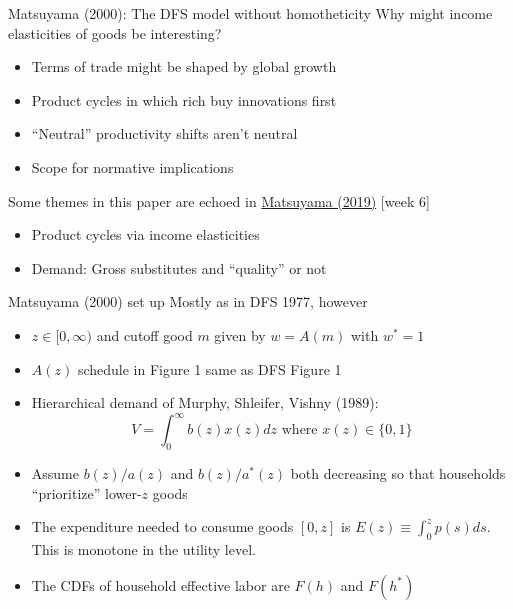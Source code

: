 \documentclass[10pt,notes=hide]{beamer}
\begin{document}
\begin{frame}{Matsuyama (2000): The DFS model without homotheticity}
Why might income elasticities of goods be interesting?
\begin{itemize}
	\item Terms of trade might be shaped by global growth
	\item Product cycles in which rich buy innovations first
	\item ``Neutral'' productivity shifts aren't neutral
	\item Scope for normative implications
\end{itemize}
Some themes in this paper are echoed in \href{https://onlinelibrary-wiley-com.proxy.uchicago.edu/doi/10.3982/ECTA13765}{Matsuyama (2019)} [week 6]
\begin{itemize}
	\item Product cycles via income elasticities
	\item Demand: Gross substitutes and ``quality'' or not
\end{itemize}
\end{frame}
\begin{frame}{Matsuyama (2000) set up}
Mostly as in DFS 1977, however
\begin{itemize}
	\item $z \in [0,\infty)$ and cutoff good $m$ given by $w=A(m)$ with $w^{*}=1$ 
	\item $A(z)$ schedule in Figure 1 same as DFS Figure 1
	\item Hierarchical demand of Murphy, Shleifer, Vishny (1989):
	\begin{equation*} V = \int_{0}^{\infty} b(z)x(z)dz \text { where } x(z) \in \{0,1\} \end{equation*}
	\item Assume $b(z)/a(z)$ and $b(z)/a^{*}(z)$ both decreasing so that households ``prioritize'' lower-$z$ goods
	\item The expenditure needed to consume goods $[0,z]$ is $E(z)\equiv \int_{0}^{z} p(s)ds$. This is monotone in the utility level.
	\item The CDFs of household effective labor are $F(h)$ and $F(h^{*})$
\end{itemize}
\end{frame}
\end{document}
